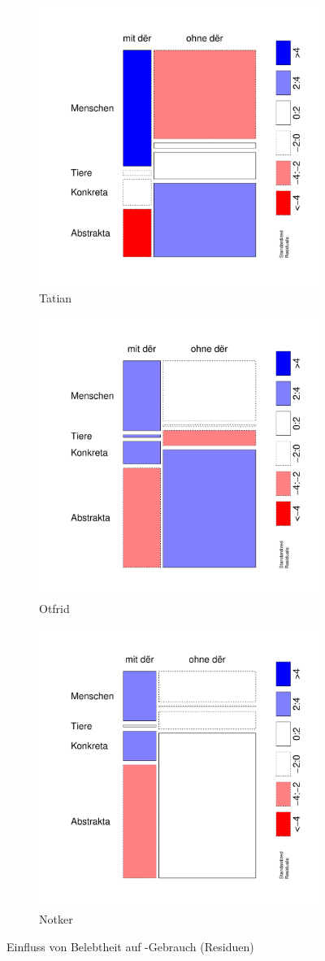 \begin{figure}
\begin{subfigure}[b]{.5\linewidth}
  \includegraphics[width=6 cm]{generated/images/residuals-bel-T}
\caption {Tatian}
\end{subfigure}%
\begin{subfigure}[b]{.5\linewidth}
  \includegraphics[width=6 cm]{generated/images/residuals-bel-O}
\caption {Otfrid}
\end{subfigure}

\begin{subfigure}[b]{.5\linewidth}
  \includegraphics[width=6 cm]{generated/images/residuals-bel-N}
\caption {Notker}
\end{subfigure}
\caption{Einfluss von Belebtheit auf -Gebrauch (Residuen)}
\label{fig:residuals-bel}
\end{figure}


